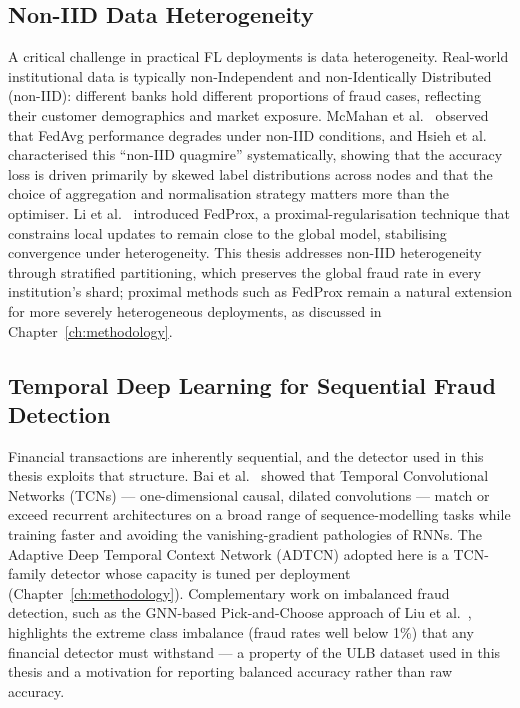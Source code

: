 \subsection{Non-IID Data Heterogeneity}

A critical challenge in practical FL deployments is data heterogeneity. Real-world institutional data is typically non-Independent and non-Identically Distributed (non-IID): different banks hold different proportions of fraud cases, reflecting their customer demographics and market exposure. McMahan et al.~\cite{mcmahan2017} observed that FedAvg performance degrades under non-IID conditions, and Hsieh et al.~\cite{hsieh2020} characterised this ``non-IID quagmire'' systematically, showing that the accuracy loss is driven primarily by skewed label distributions across nodes and that the choice of aggregation and normalisation strategy matters more than the optimiser. Li et al.~\cite{li2020fedprox} introduced FedProx, a proximal-regularisation technique that constrains local updates to remain close to the global model, stabilising convergence under heterogeneity. This thesis addresses non-IID heterogeneity through stratified partitioning, which preserves the global fraud rate in every institution's shard; proximal methods such as FedProx remain a natural extension for more severely heterogeneous deployments, as discussed in Chapter~\ref{ch:methodology}.

\subsection{Temporal Deep Learning for Sequential Fraud Detection}

Financial transactions are inherently sequential, and the detector used in this thesis exploits that structure. Bai et al.~\cite{bai2018} showed that Temporal Convolutional Networks (TCNs) --- one-dimensional causal, dilated convolutions --- match or exceed recurrent architectures on a broad range of sequence-modelling tasks while training faster and avoiding the vanishing-gradient pathologies of RNNs. The Adaptive Deep Temporal Context Network (ADTCN) adopted here is a TCN-family detector whose capacity is tuned per deployment (Chapter~\ref{ch:methodology}). Complementary work on imbalanced fraud detection, such as the GNN-based Pick-and-Choose approach of Liu et al.~\cite{liu2021pickchoose}, highlights the extreme class imbalance (fraud rates well below 1\%) that any financial detector must withstand --- a property of the ULB dataset used in this thesis and a motivation for reporting balanced accuracy rather than raw accuracy.

